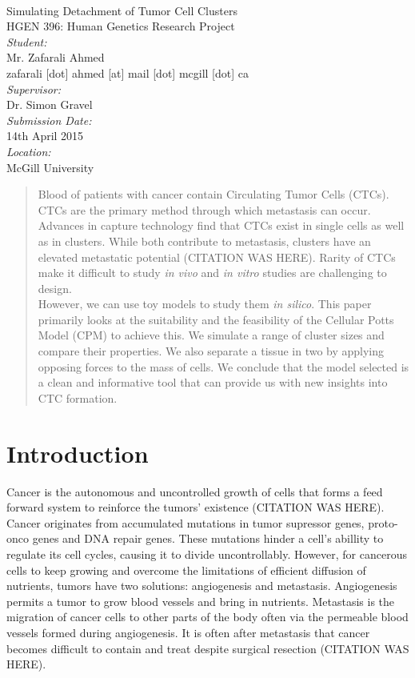 \documentclass[12pt]{article}
\begin{document}
\begin{titlepage}
	\begin{center}
		~\\[2.0cm]
		{\Huge Simulating Detachment of Tumor Cell Clusters}\\[1.5cm]
		{\Large HGEN 396: Human Genetics Research Project}\\[6.5cm]
		\emph{Student:}\\
		Mr. Zafarali Ahmed\\
		{\scriptsize zafarali [dot] ahmed [at] mail [dot] mcgill [dot] ca} \\[1.0cm]
		\emph{Supervisor:}\\
		Dr. Simon Gravel\\[1.0cm]
		\emph{Submission Date:}\\
		14th April 2015\\[1.0cm]
		\emph{Location:}\\
		McGill University
	\end{center}
\end{titlepage}

\begin{abstract}
Blood of patients with cancer contain Circulating Tumor Cells (CTCs). CTCs are the primary method through which metastasis can occur. Advances in capture technology find that CTCs exist in single cells as well as in clusters. While both contribute to metastasis, clusters have an elevated metastatic potential (CITATION WAS HERE). Rarity of CTCs make it difficult to study \emph{in vivo} and \emph{in vitro} studies are challenging to design. \\
However, we can use toy models to study them \emph{in silico}. This paper primarily looks at the suitability and the feasibility of the Cellular Potts Model (CPM) to achieve this. We simulate a range of cluster sizes and compare their properties. We also separate a tissue in two by applying opposing forces to the mass of cells. We conclude that the model selected is a clean and informative tool that can provide us with new insights into CTC formation.
\end{abstract}

\section{Introduction}
Cancer is the autonomous and uncontrolled growth of cells that forms a feed forward system to reinforce the tumors’ existence (CITATION WAS HERE). Cancer originates from accumulated mutations in tumor supressor genes, proto-onco genes and DNA repair genes. These mutations hinder a cell's abillity to regulate its cell cycles, causing it to divide uncontrollably. However, for cancerous cells to keep growing and overcome the limitations of efficient diffusion of nutrients, tumors have two solutions: angiogenesis and metastasis. Angiogenesis permits a tumor to grow blood vessels and bring in nutrients. Metastasis is the migration of cancer cells to other parts of the body often via the permeable blood vessels formed during angiogenesis. It is often after metastasis that cancer becomes difficult to contain and treat despite surgical resection (CITATION WAS HERE).
\end{document}
